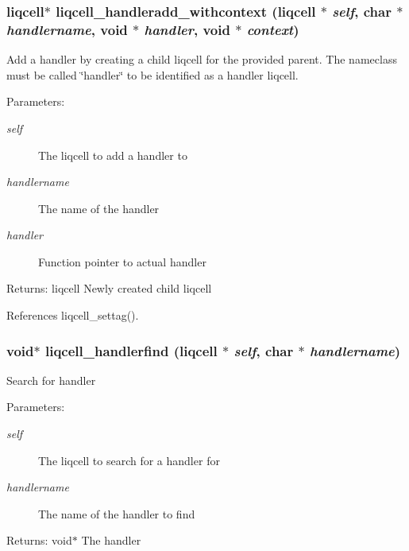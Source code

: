 \subsubsection[{liqcell\_\-handleradd\_\-withcontext}]{\setlength{\rightskip}{0pt plus 5cm}liqcell$\ast$ liqcell\_\-handleradd\_\-withcontext (liqcell $\ast$ {\em self}, \/  char $\ast$ {\em handlername}, \/  void $\ast$ {\em handler}, \/  void $\ast$ {\em context})}\label{d5/da2/liqcell_8c_d0a4310293fbd69cf93b3795970ae999}


Add a handler by creating a child liqcell for the provided parent. The nameclass must be called \char`\"{}handler\char`\"{} to be identified as a handler liqcell.

\begin{Desc}
\item[Parameters:]
\begin{description}
\item[{\em self}]The liqcell to add a handler to \item[{\em handlername}]The name of the handler \item[{\em handler}]Function pointer to actual handler \end{description}
\end{Desc}
\begin{Desc}
\item[Returns:]liqcell Newly created child liqcell \end{Desc}


References liqcell\_\-settag().
\subsubsection[{liqcell\_\-handlerfind}]{\setlength{\rightskip}{0pt plus 5cm}void$\ast$ liqcell\_\-handlerfind (liqcell $\ast$ {\em self}, \/  char $\ast$ {\em handlername})}\label{d5/da2/liqcell_8c_3f49c14107f46d1dce77603abc583cef}


Search for handler \begin{Desc}
\item[Parameters:]
\begin{description}
\item[{\em self}]The liqcell to search for a handler for \item[{\em handlername}]The name of the handler to find \end{description}
\end{Desc}
\begin{Desc}
\item[Returns:]void$\ast$ The handler \end{Desc}


